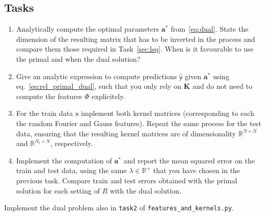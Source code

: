 \documentclass{article}
\begin{document}
\subsection*{Tasks}
\begin{enumerate}
\item Analytically compute the optimal parameters $\bm a^*$ from~\eqref{eq:dual}. State the dimension of the resulting matrix that has to be inverted in the process and compare them those required in Task~\ref{sec:lsq}. When is it favourable to use the primal and when the dual solution?
\item Give an analytic expression to compute predictions $\hat{\boldsymbol{\mathsf{y}}}$ given $\bm a^\ast$ using eq.~\eqref{eq:rel_primal_dual}, such that you only rely on $\mathbf K$ and do not need to compute the features $\Phi$ explicitely. 
\item For the train data $\boldsymbol{\mathsf{x}}$ implement both kernel matrices (corresponding to each the random Fourier and Gauss features). Repeat the same process for the test data, ensuring that the resulting kernel matrices are of dimensionality $\mathbb{R}^{N \times N}$ and $\mathbb{R}^{N_{t} \times N}$, respectively.
\item Implement the computation of $\bm a^*$ and report the mean squared error on the train and test data, using the same $\lambda \in \mathbb{R}^+$ that you have chosen in the previous task. 
Compare train and test errors obtained with the primal solution for each setting of $R$ with the dual solution.
\end{enumerate}

Implement the dual problem also in \texttt{task2} of \texttt{features\_and\_kernels.py}. 



\end{document}

